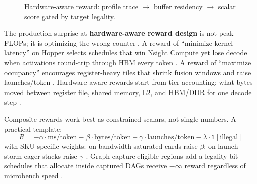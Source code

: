
\begin{figure}[t]
\centering
{}
\caption{Hardware-aware reward: profile trace $\rightarrow$ buffer residency $\rightarrow$ scalar score gated by target legality.}
\label{fig:hw_reward_architecture}
\end{figure}

The production surprise at \textbf{hardware-aware reward design} is not peak FLOPs; it is optimizing the wrong counter \citep{patel2025llminference,dlbook}. A reward of ``minimize kernel latency'' on Hopper selects schedules that win Nsight Compute yet lose decode when activations round-trip through HBM every token \citep{memoryfloor2026,dao2022flashattention,semianalysis2024tma}. A reward of ``maximize occupancy'' encourages register-heavy tiles that shrink fusion windows and raise launches/token \citep{taxbreak2026,nvidia2022hopper}. Hardware-aware rewards start from tier accounting: what bytes moved between register file, shared memory, L2, and HBM/DDR for one decode step \citep{semianalysis2024tma,dlbook,chen2020compilerbasedhardw}.

Composite rewards work best as constrained scalars, not single numbers. A practical template:
\[
R = -\alpha \cdot \mathrm{ms/token} - \beta \cdot \mathrm{bytes/token} - \gamma \cdot \mathrm{launches/token} - \lambda \cdot \mathbb{1}[\text{illegal}]
\]
with SKU-specific weights: on bandwidth-saturated cards raise $\beta$; on launch-storm eager stacks raise $\gamma$ \citep{memoryfloor2026,taxbreak2026,patel2025llminference}. Graph-capture-eligible regions add a legality bit---schedules that allocate inside captured DAGs receive $-\infty$ reward regardless of microbench speed \citep{nvidia2024cudagraphs,kwon2023vllm,yirage2026}.


